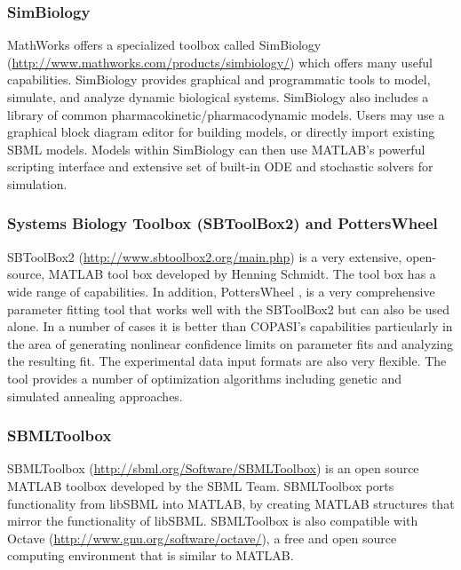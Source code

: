 \documentclass[]{article}
\begin{document}
\subsubsection{SimBiology}

MathWorks offers a specialized toolbox called SimBiology
(\url{http://www.mathworks.com/products/simbiology/}) which offers many
useful capabilities. SimBiology provides graphical and programmatic
tools to model, simulate, and analyze dynamic biological systems.
SimBiology also includes a library of common
pharmacokinetic/pharmacodynamic models. Users may use a graphical block
diagram editor for building models, or directly import existing SBML
models. Models within SimBiology can then use MATLAB's powerful
scripting interface and extensive set of built-in ODE and stochastic
solvers for simulation.

\subsubsection{Systems Biology Toolbox (SBToolBox2) and PottersWheel}

SBToolBox2 (\url{http://www.sbtoolbox2.org/main.php})
\autocite{schmidt2006systems} is a very extensive, open- source, MATLAB
tool box developed by Henning Schmidt. The tool box has a wide range of
capabilities. In addition, PottersWheel \autocite{maiwald2008dynamical},
is a very comprehensive parameter fitting tool that works well with the
SBToolBox2 but can also be used alone. In a number of cases it is better
than COPASI's capabilities particularly in the area of generating
nonlinear confidence limits on parameter fits and analyzing the
resulting fit. The experimental data input formats are also very
flexible. The tool provides a number of optimization algorithms
including genetic and simulated annealing approaches.

\subsubsection{SBMLToolbox}

SBMLToolbox (\url{http://sbml.org/Software/SBMLToolbox})
\autocite{keating2006sbmltoolbox} is an open source MATLAB toolbox
developed by the SBML Team. SBMLToolbox ports functionality from libSBML
into MATLAB, by creating MATLAB structures that mirror the functionality
of libSBML. SBMLToolbox is also compatible with Octave
(\url{http://www.gnu.org/software/octave/}), a free and open source
computing environment that is similar to MATLAB.
\end{document}
